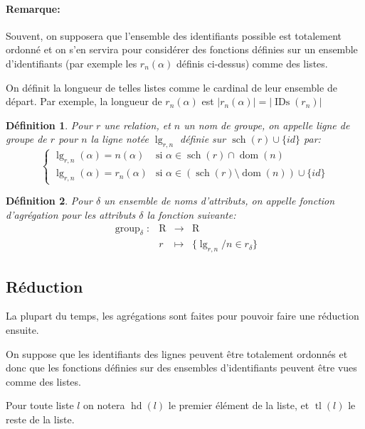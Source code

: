\documentclass[french]{article}
\DeclareMathOperator{\group}{group}
\DeclareMathOperator{\dom}{dom}
\DeclareMathOperator{\R}{R}
\DeclareMathOperator{\s}{sch}
\DeclareMathOperator{\ids}{IDs}
\DeclareMathOperator{\lgr}{lg}
\DeclareMathOperator{\head}{hd}
\DeclareMathOperator{\tail}{tl}
\newcommand{\groupDelta}{\group_{\delta}}
\newcommand{\cip}{\cup \{id\}}
\newtheorem{defi}{Définition}
\begin{document}
\paragraph{Remarque:}
Souvent, on supposera que l'ensemble des identifiants possible
est totalement ordonné et on s'en servira pour considérer
des fonctions définies sur un ensemble d'identifiants
(par exemple les $r_n(\alpha)$ définis ci-dessus) 
comme des listes.

On définit la longueur de telles listes comme le cardinal
de leur ensemble de départ.
Par exemple, la longueur de $r_n(\alpha)$
est $|r_n(\alpha)| = |\ids(r_n)|$

\begin{defi}
	Pour $r$ une relation, et $n$ un nom de groupe,
	on appelle \emph{ligne de groupe de $r$ pour $n$}
	la ligne notée $\lgr_{r,n}$ définie sur $\s(r) \cip$ par:
	$$
	\left\lbrace
	\begin{array}{ll}
	\lgr_{r, n}(\alpha) = n(\alpha) & \text{si $\alpha \in \s(r) \cap \dom(n)$} \\
	\lgr_{r, n}(\alpha) = r_n(\alpha) & \text{si $\alpha \in (\s(r) \setminus \dom(n)) \cip$}
	\end{array}
	\right.
	$$ 
\end{defi}

\begin{defi}
	Pour $\delta$ un ensemble de noms d'attributs,
	on appelle \emph{fonction d'agrégation pour les attributs $\delta$}
	la fonction suivante:
	$$
	\begin{array}{llcl}
	\groupDelta: & \R & \rightarrow &  \R \\
			& r & \mapsto & \{ \lgr_{r,n} / n \in r_\delta \}
	\end{array}
	$$
\end{defi}

\subsection*{Réduction}
La plupart du temps, les agrégations sont faites pour pouvoir faire une
réduction ensuite.

On suppose que les identifiants des lignes peuvent être totalement ordonnés
et donc que les fonctions définies sur des ensembles d'identifiants peuvent
être vues comme des listes.

Pour toute liste $l$ on notera $\head(l)$ le premier élément de la liste,
et $\tail(l)$ le reste de la liste. \\
\end{document}
